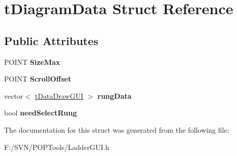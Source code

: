 \hypertarget{structt_diagram_data}{\section{t\-Diagram\-Data Struct Reference}
\label{structt_diagram_data}
}
\subsection*{Public Attributes}
\begin{DoxyCompactItemize}
\item 
\hypertarget{structt_diagram_data_a839e5db4507a397585104f9b55ab458e}{P\-O\-I\-N\-T {\bfseries Size\-Max}}\label{structt_diagram_data_a839e5db4507a397585104f9b55ab458e}

\item 
\hypertarget{structt_diagram_data_a5101f8e25333a8147adc3f6e4015ab8a}{P\-O\-I\-N\-T {\bfseries Scroll\-Offset}}\label{structt_diagram_data_a5101f8e25333a8147adc3f6e4015ab8a}

\item 
\hypertarget{structt_diagram_data_aa8d29be3065552164ebd8f72dc8ac0cf}{vector$<$ \hyperlink{structt_data_draw_g_u_i}{t\-Data\-Draw\-G\-U\-I} $>$ {\bfseries rung\-Data}}\label{structt_diagram_data_aa8d29be3065552164ebd8f72dc8ac0cf}

\item 
\hypertarget{structt_diagram_data_a39a177a1113c19363b6e0dd9411caf67}{bool {\bfseries need\-Select\-Rung}}\label{structt_diagram_data_a39a177a1113c19363b6e0dd9411caf67}

\end{DoxyCompactItemize}


The documentation for this struct was generated from the following file\-:\begin{DoxyCompactItemize}
\item 
F\-:/\-S\-V\-N/\-P\-O\-P\-Tools/Ladder\-G\-U\-I.\-h\end{DoxyCompactItemize}
